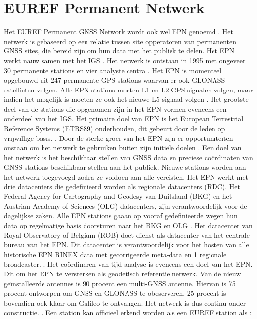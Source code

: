 \section{EUREF Permanent Netwerk}
Het EUREF Permanent GNSS Network wordt ook wel EPN genoemd \cite{LBibEPN3,LBibEPN2,LBibEPN}. Het netwerk is gebaseerd op een relatie tussen site opperatoren van permanenten GNSS sites, die bereid zijn om hun data met het publiek te delen. Het EPN werkt nauw samen met het IGS \cite{LBibEPN3}. Het netwerk is ontstaan in 1995 met ongeveer 30 permanente stations en vier analyste centra \cite{LBibEPN5}. Het EPN is momenteel opgebouwd uit 247 permanente GPS stations waarvan er ook GLONASS satellieten volgen. Alle EPN stations moeten L1 en L2 GPS signalen volgen, maar indien het mogelijk is moeten ze ook het nieuwe L5 signaal volgen \cite{LBibEPN4}. Het grootste deel van de stations die opgenomen zijn in het EPN vormen eveneens een onderdeel van het IGS. Het primaire doel van EPN is het European Terrestrial Reference Systems (ETRS89) onderhouden, dit gebeurt door de leden op vrijwillige basis. \cite{LBibEPN}  \cite{LBibEPN2}. Door de sterke groei van het EPN zijn er opportuniteiten onstaan om het netwerk te gebruiken buiten zijn initi\"ele doelen \cite{LBibEPN5}. Een doel van het netwerk is het beschikbaar stellen van GNSS data en preciese co\"ordinaten van GNSS stations beschikbaar stellen aan het publiek. Nieuwe stations worden aan het netwerk toegevoegd zodra ze voldoen aan alle vereisten. Het EPN werkt met drie datacenters die gedefinieerd worden als regionale datacenters (RDC). Het Federal Agency for Cartography and Geodesy van Duitsland (BKG) en het Austrian Academy of Sciences (OLG)  datacenters, zijn verantwoordelijk voor de dagelijkse zaken. Alle EPN stations gaaan op vooraf gedefinieerde wegen hun data op regelmatige basis doorsturen naar het BKG en OLG \cite{LBibEPN2}. Het datacenter van Royal Observatory of Belgium (ROB) doet dienst als datacenter van het centrale bureau van het EPN. Dit datacenter is verantwoordelijk voor het hosten van alle historische EPN RINEX data met gecorrigeerde meta-data en 1 regionale broadcaster. \cite{LBibEPN2,LBibEPN3}. Het co\"ordineren van tijd analyse is eveneens een doel van het EPN. Dit om het EPN te versterken als geodetisch referentie netwerk. Van de nieuw ge\"installeerde antennes is 90 procent een multi-GNSS antenne. Hiervan is 75 procent ontworpen om GNSS en GLONASS te obeserveren, 25 procent is bovendien ook klaar om Galileo te ontvangen. Het netwerk is dus continu onder constructie. \cite{LBibEPN3}. Een station kan officieel erkend worden als een EUREF station als \cite{LBibGNSS8}:
